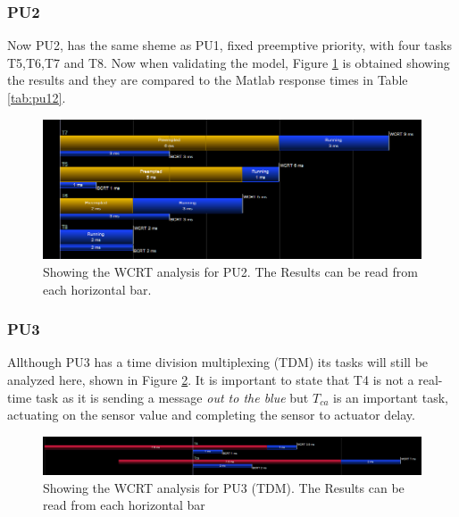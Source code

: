 \subsubsection{PU2}
Now PU2, has the same sheme as PU1, fixed preemptive priority, with four tasks T5,T6,T7 and T8. Now when validating the model, Figure \ref{fig:pu2rt} is obtained showing the results and they are compared to the Matlab response times in Table \ref{tab:pu12}.

\begin{figure}[h!]
	\begin{center}
		\includegraphics[width=\linewidth]{img/pu2-response-time}
		\caption{Showing the WCRT analysis for PU2. The Results can be read from each horizontal bar.}
		\label{fig:pu2rt}
	\end{center}
\end{figure}

\subsubsection{PU3}

Allthough PU3 has a time division multiplexing (TDM) its tasks will still be analyzed here, shown in Figure \ref{fig:pu3rt}. It is important to state that T4 is not a real-time task as it is sending a message \textit{out to the blue} but $T_{ca}$ is an important task, actuating on the sensor value and completing the sensor to actuator delay.

\begin{figure}[h!]
	\begin{center}
		\includegraphics[width=\linewidth]{img/pu3-response-time}
		\caption{Showing the WCRT analysis for PU3 (TDM). The Results can be read from each horizontal bar}
		\label{fig:pu3rt}
	\end{center}
\end{figure}


